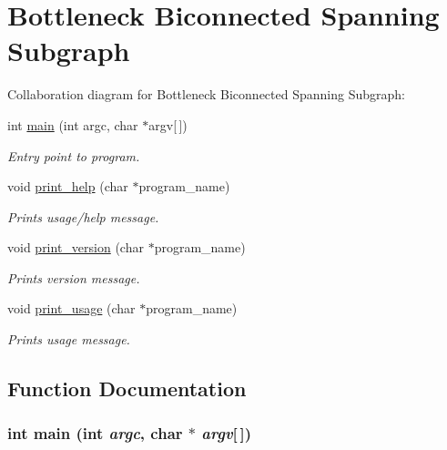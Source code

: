 \hypertarget{group__bbssp}{
\section{Bottleneck Biconnected Spanning Subgraph}
\label{group__bbssp}
}


Collaboration diagram for Bottleneck Biconnected Spanning Subgraph:\begin{CompactItemize}
\item 
int \hyperlink{group__bbssp_g0ddf1224851353fc92bfbff6f499fa97}{main} (int argc, char $\ast$argv\mbox{[}$\,$\mbox{]})
\begin{CompactList}\small\item\em Entry point to program. \item\end{CompactList}\item 
void \hyperlink{group__bbssp_gb090c3311cfe36c9908201e66e09a06b}{print\_\-help} (char $\ast$program\_\-name)
\begin{CompactList}\small\item\em Prints usage/help message. \item\end{CompactList}\item 
void \hyperlink{group__bbssp_g0e9eb03b516f80fc4b993ef37b334376}{print\_\-version} (char $\ast$program\_\-name)
\begin{CompactList}\small\item\em Prints version message. \item\end{CompactList}\item 
void \hyperlink{group__bbssp_g767128a69bdfad046920286832102a40}{print\_\-usage} (char $\ast$program\_\-name)
\begin{CompactList}\small\item\em Prints usage message. \item\end{CompactList}\end{CompactItemize}


\subsection{Function Documentation}
\hypertarget{group__bbssp_g0ddf1224851353fc92bfbff6f499fa97}{
\subsubsection{\setlength{\rightskip}{0pt plus 5cm}int main (int {\em argc}, \/  char $\ast$ {\em argv}\mbox{[}$\,$\mbox{]})}}
\label{group__bbssp_g0ddf1224851353fc92bfbff6f499fa97}


